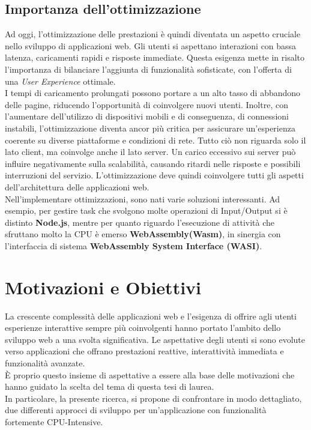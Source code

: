 \subsection{Importanza dell'ottimizzazione}
Ad oggi, l'ottimizzazione delle prestazioni è quindi diventata un aspetto cruciale nello sviluppo di applicazioni web.
Gli utenti si aspettano interazioni con bassa latenza, caricamenti rapidi e risposte immediate.
Questa esigenza mette in risalto l'importanza di bilanciare l'aggiunta di funzionalità sofisticate, con l'offerta di una \emph{User Experience} ottimale.
\\I tempi di caricamento prolungati possono portare a un alto tasso di abbandono delle pagine, riducendo l'opportunità di coinvolgere nuovi utenti.
Inoltre, con l'aumentare dell'utilizzo di dispositivi mobili e di conseguenza, di connessioni instabili, l'ottimizzazione diventa ancor più critica per assicurare un'esperienza coerente su diverse piattaforme e condizioni di rete.
Tutto ciò non riguarda solo il lato client, ma coinvolge anche il lato server. 
Un carico eccessivo sui server può influire negativamente sulla scalabilità, causando ritardi nelle risposte e possibili interruzioni del servizio.
L'ottimizzazione deve quindi coinvolgere tutti gli aspetti dell'architettura delle applicazioni web.
\\Nell'implementare ottimizzazioni, sono nati varie soluzioni interessanti. Ad esempio, per gestire task che svolgono molte operazioni di Input/Output si è distinto \textbf{Node.js}, mentre per quanto riguardo l'esecuzione di attività che sfruttano molto la CPU è emerso \textbf{WebAssembly(Wasm)}, in sinergia con l'interfaccia di sistema \textbf{WebAssembly System Interface (WASI)}.


\newpage
\section{Motivazioni e Obiettivi}
\label{sec:Obiettivi}
La crescente complessità delle applicazioni web e l'esigenza di offrire agli utenti esperienze interattive sempre più coinvolgenti hanno portato l'ambito dello sviluppo web a una svolta significativa.
Le aspettative degli utenti si sono evolute verso applicazioni che offrano prestazioni reattive, interattività immediata e funzionalità avanzate.
\\È proprio questo insieme di aspettative a essere alla base delle motivazioni che hanno guidato la scelta del tema di questa tesi di laurea.
\\In particolare, la presente ricerca, si propone di confrontare in modo dettagliato, due differenti approcci di sviluppo per un'applicazione con funzionalità fortemente CPU-Intensive.
